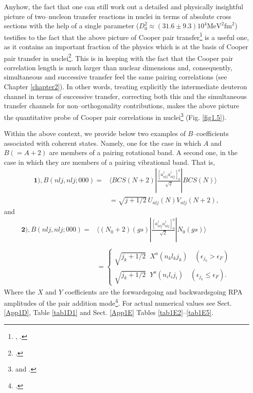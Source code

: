 Anyhow, the fact that one can still work out a detailed and physically insightful picture of two--nucleon transfer reactions in nuclei in terms of absolute cross sections with the help of a single parameter ($D_0^2\approx(31.6\pm 9.3)10^4 \text{MeV}^2\text{fm}^2$) testifies to the fact that the above picture of Cooper pair transfer\footnote{\cite{Glendenning:65}, \cite{Bayman:67}.} is a useful one, as it contains an important fraction of the physics which is at the basis of Cooper pair transfer in nuclei\footnote{\cite{Broglia:73}.}. This is in keeping with the fact that the Cooper pair correlation length is much larger than nuclear dimensions and, consequently, simultaneous and successive transfer feel the same pairing correlations (see Chapter \ref{chapter2}). In other words, treating explicitly the intermediate deuteron channel in terms of successive transfer, correcting both this and the simultaneous transfer channels for non--orthogonality contributions, makes the above picture the quantitative probe of Cooper pair correlations in nuclei\footnote{\cite{Bayman:82} and \cite{Potel:13}.} (Fig. \ref{fig1.5}).


 Within the above context, we provide below two examples of $B$--coefficients associated with coherent states. Namely, one for the case in which $A$ and $B(=A+2)$ are members of a pairing rotational band. A second one, in the case in which they are members of a pairing vibrational band. That is, 
\begin{equation}\label{eqC21.8}
\begin{split}
\mathbf{1)}, B(nlj,nlj;000)=&\langle BCS(N+2)|\frac{[a^\dagger_{nlj}a^\dagger_{nlj}]^0_0}{\sqrt{2}}|BCS(N)\rangle\\
&=\sqrt{j+1/2}\,U_{nlj}(N)V_{nlj}(N+2),
\end{split}
\end{equation}
and
\begin{equation}
\begin{split}
\mathbf{2)}, B(nlj,nlj;000)=&\langle (N_0+2)(gs)|\frac{[a^\dagger_{nlj}a^\dagger_{nlj}]^0_0}{\sqrt{2}}|N_0(gs)\rangle \\
&\\
&=\left\{\begin{array}{c}
 \sqrt{j_k+1/2}\;\;X^a(n_kl_kj_k)\quad (\epsilon_{j_k}>\epsilon_F) \\ 
\sqrt{j_k+1/2}\;\;Y^a(n_il_ij_i)\quad (\epsilon_{j_k}\leq\epsilon_F).
\end{array} \right.
\end{split}
\end{equation}
Where the $X$ and $Y$ coefficients are the forwardsgoing and backwardsgoing RPA amplitudes of the pair addition mode\footnote{\cite{Brink:05}.}.
For actual numerical values see Sect. \ref{App1D}, Table \ref{tab1D1} and Sect. \ref{App1E} Tables \ref{tab1E2}--\ref{tab1E5}.


